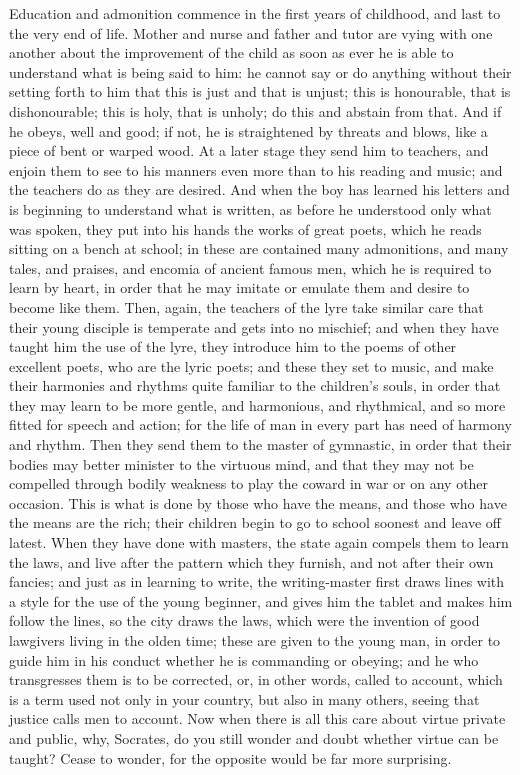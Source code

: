 \documentclass[11pt,letter]{article}
\begin{document}
\par  Education and admonition commence in the first years of childhood, and last to the very end of life. Mother and nurse and father and tutor are vying with one another about the improvement of the child as soon as ever he is able to understand what is being said to him: he cannot say or do anything without their setting forth to him that this is just and that is unjust; this is honourable, that is dishonourable; this is holy, that is unholy; do this and abstain from that. And if he obeys, well and good; if not, he is straightened by threats and blows, like a piece of bent or warped wood. At a later stage they send him to teachers, and enjoin them to see to his manners even more than to his reading and music; and the teachers do as they are desired. And when the boy has learned his letters and is beginning to understand what is written, as before he understood only what was spoken, they put into his hands the works of great poets, which he reads sitting on a bench at school; in these are contained many admonitions, and many tales, and praises, and encomia of ancient famous men, which he is required to learn by heart, in order that he may imitate or emulate them and desire to become like them. Then, again, the teachers of the lyre take similar care that their young disciple is temperate and gets into no mischief; and when they have taught him the use of the lyre, they introduce him to the poems of other excellent poets, who are the lyric poets; and these they set to music, and make their harmonies and rhythms quite familiar to the children's souls, in order that they may learn to be more gentle, and harmonious, and rhythmical, and so more fitted for speech and action; for the life of man in every part has need of harmony and rhythm. Then they send them to the master of gymnastic, in order that their bodies may better minister to the virtuous mind, and that they may not be compelled through bodily weakness to play the coward in war or on any other occasion. This is what is done by those who have the means, and those who have the means are the rich; their children begin to go to school soonest and leave off latest. When they have done with masters, the state again compels them to learn the laws, and live after the pattern which they furnish, and not after their own fancies; and just as in learning to write, the writing-master first draws lines with a style for the use of the young beginner, and gives him the tablet and makes him follow the lines, so the city draws the laws, which were the invention of good lawgivers living in the olden time; these are given to the young man, in order to guide him in his conduct whether he is commanding or obeying; and he who transgresses them is to be corrected, or, in other words, called to account, which is a term used not only in your country, but also in many others, seeing that justice calls men to account. Now when there is all this care about virtue private and public, why, Socrates, do you still wonder and doubt whether virtue can be taught? Cease to wonder, for the opposite would be far more surprising.
\end{document}
